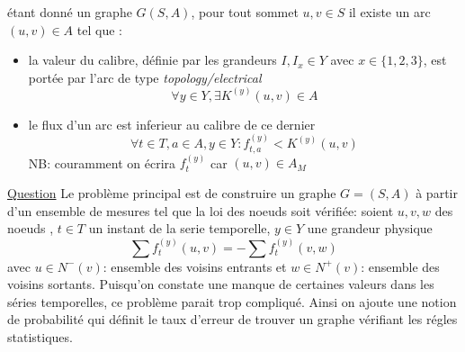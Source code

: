 \documentclass[onecolumn, 12pt]{article}
\begin{document}
\'etant donn\'e un graphe $G(S, A)$, pour tout sommet $u, v \in S$ il existe un arc  $(u, v) \in A$ tel que :
\begin{itemize}
	\item la valeur du calibre, d\'efinie par les grandeurs $I, I_{x} \in Y$ avec  $x \in  \{ 1,2,3\}$, est port\'ee par l'arc de type \textit{topology/electrical}
	\[
		\forall y \in Y, \exists K^{(y)}(u,v) \in A
	\]
	\item le flux d'un arc est inferieur au calibre de ce dernier
	\[
		\forall t \in T, a \in A, y \in Y : f_{t,a}^{(y)} < K^{(y)}(u,v)
	\]	
	NB: couramment on \'ecrira $f_{t}^{(y)}$ car $(u,v) \in A_{M}$
\end{itemize}

\underline{Question}
Le probl\`eme principal est de construire un graphe $G = (S, A)$ \`a partir d'un ensemble de mesures 
tel que la loi des noeuds soit v\'erifi\'ee: soient $u, v, w$ des noeuds , $t \in T$ un instant de la serie temporelle, $y \in Y$ une grandeur physique
\[
	\sum f_{t}^{(y)} (u,v) = -\sum f_{t}^{(y)} (v, w)
\]
avec $u \in N^{-}(v)$: ensemble des voisins entrants et $w \in N^{+}(v)$: ensemble des voisins sortants. \newline
Puisqu'on constate une manque de certaines valeurs dans les s\'eries temporelles, ce probl\`eme parait trop compliqu\'e.
Ainsi on ajoute une notion de probabilit\'e qui d\'efinit  le taux d'erreur de trouver un graphe v\'erifiant les r\'egles statistiques.
\end{document}
